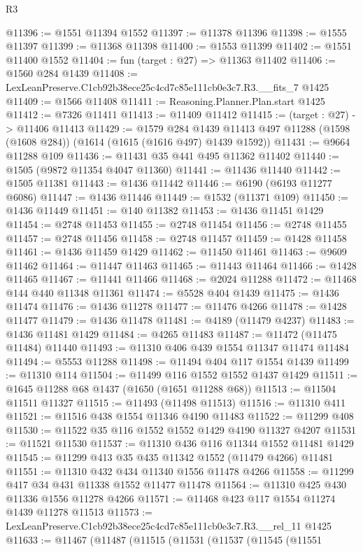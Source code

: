 \begin{lexlean}{R3}
\begin{coremodule}
@11396 := @1551 @11394 @1552
@11397 := @11378 @11396
@11398 := @1555 @11397
@11399 := @11368 @11398
@11400 := @1553 @11399
@11402 := @1551 @11400 @1552
@11404 := fun (target : @27) => @11363 @11402
@11406 := @1560 @284 @1439
@11408 := LexLeanPreserve.C1cb92b38ece25c4cd7c85e111cb0e3c7.R3.__fits_7 @1425
@11409 := @1566 @11408
@11411 := Reasoning.Planner.Plan.start @1425
@11412 := @7326 @11411
@11413 := @11409 @11412
@11415 := (target : @27) -> @11406 @11413
@11429 := @1579
    @284
    @1439
    @11413
    @497
    @11288
    (@1598 (@1608 @284))
    (@1614 (@1615 (@1616 @497) @1439 @1592))
@11431 := @9664 @11288 @109
@11436 := @11431 @35 @441 @495 @11362 @11402
@11440 := @1505 (@9872 @11354 @4047 @11360)
@11441 := @11436 @11440
@11442 := @1505 @11381
@11443 := @1436 @11442
@11446 := @6190 (@6193 @11277 @6086)
@11447 := @1436 @11446
@11449 := @1532 (@11371 @109)
@11450 := @1436 @11449
@11451 := @140 @11382
@11453 := @1436 @11451 @1429
@11454 := @2748 @11453
@11455 := @2748 @11454
@11456 := @2748 @11455
@11457 := @2748 @11456
@11458 := @2748 @11457
@11459 := @1428 @11458
@11461 := @1436 @11459 @1429
@11462 := @11450 @11461
@11463 := @9609 @11462
@11464 := @11447 @11463
@11465 := @11443 @11464
@11466 := @1428 @11465
@11467 := @11441 @11466
@11468 := @2024 @11288
@11472 := @11468 @144 @440 @11348 @11361
@11474 := @5528 @404 @1439
@11475 := @1436 @11474
@11476 := @1436 @11278
@11477 := @11476 @4266
@11478 := @1428 @11477
@11479 := @1436 @11478
@11481 := @4189 (@11479 @4237)
@11483 := @1436 @11481 @1429
@11484 := @4265 @11483
@11487 := @11472 (@11475 @11484) @11440
@11493 := @11310 @406 @439 @1554 @11347 @11474 @11484
@11494 := @5553 @11288
@11498 := @11494 @404 @117 @1554 @1439
@11499 := @11310 @114
@11504 := @11499 @116 @1552 @1552 @1437 @1429
@11511 := @1645 @11288 @68 @1437 (@1650 (@1651 @11288 @68))
@11513 := @11504 @11511 @11327
@11515 := @11493 (@11498 @11513)
@11516 := @11310 @411
@11521 := @11516 @438 @1554 @11346 @4190 @11483
@11522 := @11299 @408
@11530 := @11522 @35 @116 @1552 @1552 @1429 @4190 @11327 @4207
@11531 := @11521 @11530
@11537 := @11310 @436 @116 @11344 @1552 @11481 @1429
@11545 := @11299 @413 @35 @435 @11342 @1552 (@11479 @4266) @11481
@11551 := @11310 @432 @434 @11340 @1556 @11478 @4266
@11558 := @11299 @417 @34 @431 @11338 @1552 @11477 @11478
@11564 := @11310 @425 @430 @11336 @1556 @11278 @4266
@11571 := @11468 @423 @117 @1554 @11274 @1439 @11278 @11513
@11573 := LexLeanPreserve.C1cb92b38ece25c4cd7c85e111cb0e3c7.R3.__rel_11 @1425
@11633 := @11467
    (@11487
      (@11515
        (@11531
          (@11537
            (@11545
              (@11551

\end{coremodule}
\end{lexlean}
